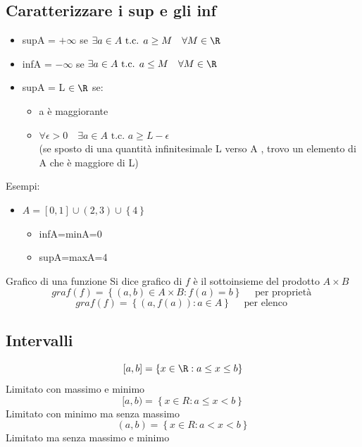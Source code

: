 \subsection{Caratterizzare i sup e gli inf}
\begin{itemize}
	\item supA = $ + \infty$ se $ \exists a  \in A \text{ t.c. } a\ge M \quad \forall M  \in  \R$
	\item infA = $- \infty$ se $ \exists a  \in  A \text{ t.c. } a \le M \quad \forall M  \in \R$
	\item supA = L $  \in \R$ se:
	      \begin{itemize}
		      \item a è maggiorante
		      \item $ \forall \epsilon > 0 \quad \exists a  \in  A \text{ t.c. } a \ge L-\epsilon$ \\(se sposto di una quantità infinitesimale L verso A , trovo un elemento di A che è maggiore di L)
	      \end{itemize}
\end{itemize}
%
\hr
%
Esempi:
\begin{itemize}
	\item $A = [0,1]  \cup \left( 2,3 \right)  \cup \left\{ 4 \right\} $
	      \begin{itemize}
		      \item infA=minA=0
		      \item supA=maxA=4
	      \end{itemize}
\end{itemize}
\begin{definizione}{Grafico di una funzione}
	Si dice grafico di $f$ è il sottoinsieme del prodotto $A \times B$ \[
		graf\left( f \right) = \left\{ \left( a,b \right)  \in  A \times B : f\left( a \right)  = b \right\} \quad \text{ per proprietà }
	\]
	\[
		graf\left( f \right) = 	\left\{ \left( a, f\left( a \right)  \right) : a  \in A \right\} \quad \text{ per elenco }
	\]
\end{definizione}
\subsection{Intervalli}
\label{sec:dd}
\[
	\left[ a,b \right] = \left\{ x  \in  \R : a \le x \le b \right\}
\]
Limitato con massimo e minimo
\[
	[a,b) = \left\{ x  \in R : a \le x < b \right\}
\]
Limitato con minimo ma senza massimo
\[
	\left( a,b \right) = \left\{ x  \in  R : a<x<b \right\}
\]
Limitato ma senza massimo e minimo


